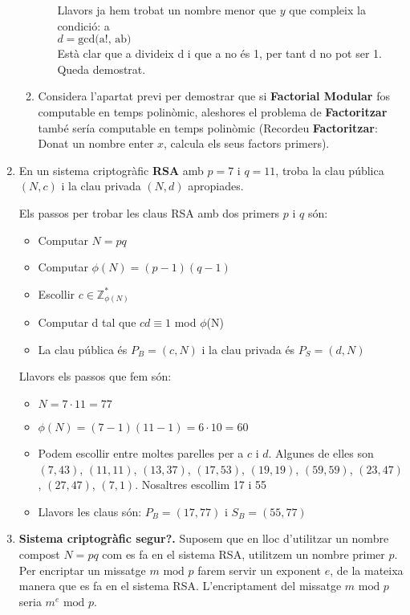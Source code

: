 \documentclass[a4paper,10pt]{article}
\begin{document}
\begin{enumerate}
\begin{enumerate}
\begin{itemize}
   Llavors ja hem trobat un nombre menor que $y$ que compleix la condició: a \\
   $d = \textrm{gcd(a!, ab)}$ \\
   Està clar que a divideix d i que a no és 1, per tant d no pot ser 1. Queda demostrat.
   
  \end{itemize}


  
  \item Considera l'apartat previ per demostrar que si \textbf{Factorial Modular} fos computable en temps polinòmic, aleshores el problema de \textbf{Factoritzar} també sería computable en temps polinòmic (Recordeu \textbf{Factoritzar}: Donat un nombre enter $x$, calcula els seus factors primers).
 \end{enumerate}

 \item En un sistema criptogràfic \textbf{RSA} amb $p = 7$ i $q = 11$, troba la clau pública $(N,c)$ i la clau privada $(N,d)$ apropiades.

 Els passos per trobar les claus RSA amb dos primers $p$ i $q$ són:
 \begin{itemize}
  \item Computar $N = pq$
  \item Computar $\phi(N) = (p - 1)(q - 1)$
  \item Escollir $c \in \mathds{Z}_{\phi(N)}^*$
  \item Computar d tal que $cd \equiv 1 $ mod $\phi$(N)
  \item La clau pública és $P_B = (c,N)$ i la clau privada és $P_S = (d,N)$
 \end{itemize}
 
 Llavors els passos que fem són:
 \begin{itemize}
 \item $N = 7 \cdot 11 = 77$
 \item $\phi(N) = (7 - 1)(11 - 1) = 6 \cdot 10 = 60$
  \item Podem escollir entre moltes parelles per a $c$ i $d$. Algunes de elles son $(7,43)$, 
  $(11,11)$, 
  $(13,37)$, 
  $(17,53)$, 
  $(19,19)$, 
  $(59,59)$, 
  $(23,47)$, 
  $(27,47)$, 
  $(7,1)$. Nosaltres escollim 17 i 55
  \item Llavors les claus són: $P_B = (17, 77)$ i $S_B = (55, 77)$
 \end{itemize}


 
 
 \item \textbf{Sistema criptogràfic segur?. }Suposem que en lloc d'utilitzar un nombre compost $N = pq$ com es fa en el sistema RSA, utilitzem un nombre primer $p$. Per encriptar un missatge $m \textrm{ mod } p$ farem servir un exponent $e$, de la mateixa manera que es fa en el sistema RSA. L'encriptament del missatge $m \textrm{ mod } p$ seria $m^e \textrm{ mod } p$.
 

\end{enumerate}
\end{document}
